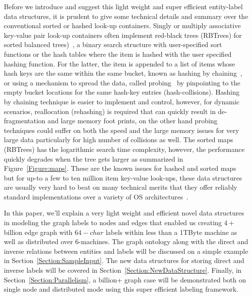 \documentclass[preprint,3p,twocolumn]{elsarticle}
\begin{document}
Before we introduce and suggest this light weight and super efficient entity-label data structures, it is prudent to give some technical details and summary over the conventional sorted or hashed look-up containers. Singly or multiply associative key-value pair look-up containers often implement red-black trees (RBTrees) for sorted balanced trees)~\cite{rbt,rbt2}, a binary search structure with user-specified sort functions or the hash tables where the item is hashed with the user specified hashing function. For the latter, the item is appended to a list of items whose hash keys are the same within the same bucket, known as hashing by chaining~\cite{hash,hash2}, or using a mechanism to spread the data, called probing~\cite{probing,probing2} by pinpointing to the empty bucket locations for the same hash-key entries (hash-collisions). Hashing by chaining technique is easier to implement and control, however, for dynamic scenarios, reallocation (rehashing) is required that can quickly result in de-fragmentation and large memory foot prints, on the other hand probing techniques could suffer on both the speed and the large memory issues for very large data particularly for high number of collisions as well. The sorted maps (RBTrees) has the logarithmic search time complexity, however, the performance quickly degrades when the tree gets larger as summarized in Figure~\ref{Figure:maps}. These are the known issues for hashed and sorted maps but for up-to a few to ten million item key-value look-ups, these data structures are usually very hard to beat on many technical merits that they offer reliably standard implementations over a variety of OS architectures~\cite{benchmark}. 

In this paper, we'll explain a very light weight and efficient novel data structures in modeling the graph labels to nodes and edges that enabled us creating $4+$ billion edge graph with $64-char$ labels within less than a 1TByte machine as well as distributed over 6-machines.  The graph ontology along with the direct and inverse relations between entities and labels will be discussed on a simple example in Section~\ref{Section:SampleInput}. The new data structures for storing direct and inverse labels will be covered in Section~\ref{Section:NewDataStructure}. Finally, in Section~\ref{Section:Parallelism}, a billion+ graph case will be demonstrated both on single node and distributed mode using this super efficient labeling framework.
\end{document}
